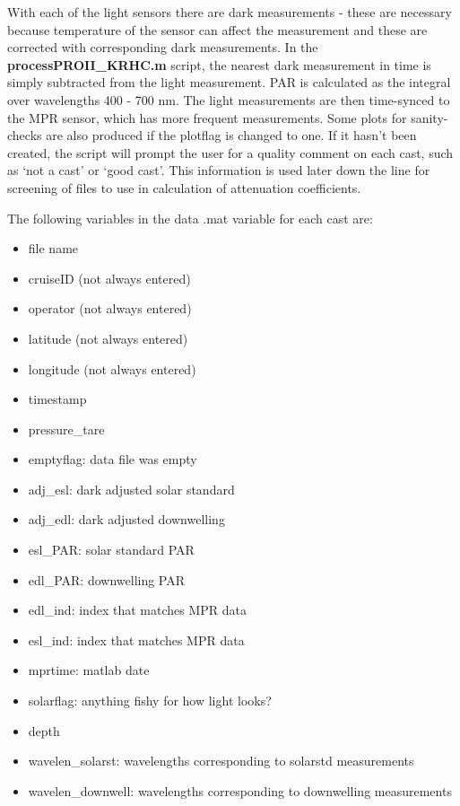 \documentclass[11pt]{article}
\begin{document}
With each of the light sensors there are dark measurements - these are necessary because temperature of the sensor can affect the measurement and these are corrected with corresponding dark measurements. In the \textbf{processPROII\_KRHC.m} script, the nearest dark measurement in time is simply subtracted from the light measurement. PAR is calculated as the integral over wavelengths 400 - 700 nm. The light measurements are then time-synced to the MPR sensor, which has more frequent measurements. Some plots for sanity-checks are also produced if the plotflag is changed to one. If it hasn't been created, the script will prompt the user for a quality comment on each cast, such as `not a cast' or `good cast'. This information is used later down the line for screening of files to use in calculation of attenuation coefficients.

The following variables in the data .mat variable for each cast are:

\begin{itemize}
\item file name
\item  cruiseID (not always entered)
\item operator  (not always entered)
\item latitude (not always entered) 
\item   longitude (not always entered)
\item    timestamp 
\item    pressure\_tare 
\item    emptyflag: data file was empty 
\item    adj\_esl: dark adjusted solar standard
\item    adj\_edl: dark adjusted downwelling
\item    esl\_PAR: solar standard PAR
\item    edl\_PAR: downwelling PAR
\item    edl\_ind: index that matches MPR data
\item    esl\_ind: index that matches MPR data
\item    mprtime: matlab date
\item    solarflag: anything fishy for how light looks?
\item    depth
\item wavelen\_solarst: wavelengths corresponding to solarstd measurements
\item wavelen\_downwell: wavelengths corresponding to downwelling measurements
\end{itemize}
\end{document}
